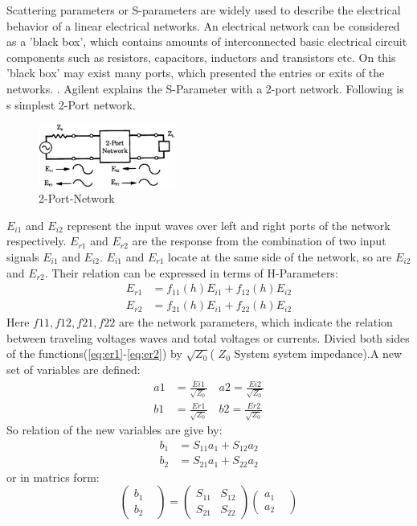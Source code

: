 
Scattering parameters or S-parameters are widely used to describe the electrical behavior of a linear electrical networks. An electrical network can be considered as a 'black box', which contains amounts of interconnected basic electrical circuit components such as  resistors, capacitors, inductors and transistors etc. On this 'black box' may exist many ports, which presented the entries or exits of the networks. 
.
Agilent\cite{aglient_s_parameters} explains the S-Parameter with a 2-port network. Following is s simplest 2-Port network.
\begin{figure}
\centering
\includegraphics[width=0.4\textwidth]{bilder/s_parameters}
\caption{2-Port-Network \cite{aglient_s_parameters}}
\label{fig:2_port_network}
\end{figure}
$E_{i1}$ and $E_{i2}$ represent the input waves over left and right ports of the network respectively. $E_{r1}$ and $E_{r2}$ are the response from the combination of two input signals $E_{i1}$ and $E_{i2}$. $E_{i1}$ and $E_{r1}$ locate at the same side of the network, so are $E_{i2}$ and $E_{r2}$. Their relation can  be expressed in terms of H-Parameters: 
\begin{align}
E_{r1}&=f_{11}(h)E_{i1}+f_{12}(h)E_{i2}
\label{eq:er1}
\\
E_{r2}&=f_{21}(h)E_{i1}+f_{22}(h)E_{i2}
\label{eq:er2}
\end{align}
Here $f11,f12,f21,f22$ are the network parameters, which indicate the relation between traveling voltages waves  and total voltages or currents. Divied both sides of the functions(\ref{eq:er1}-\ref{eq:er2}) by $\sqrt{Z_{0}}$( $Z_{0}$ System system impedance).A new set of variables are defined:
\begin{align} 
a1&=\frac{Ei1}{\sqrt{Z_{0}}} \quad a2=\frac{Ei2}{\sqrt{Z_{0}}}\\
b1&=\frac{Er1}{\sqrt{Z_{0}}} \quad b2=\frac{Er2}{\sqrt{Z_{0}}}
\end{align}
So relation of the new variables are give by:
\begin{align}
b_{1}&=S_{11}a_{1}+S_{12}a_{2}\\
b_{2}&=S_{21}a_{1}+S_{22}a_{2}
\end{align}
or in matrics form:
\begin{equation}
		\begin{pmatrix}
			b_{1}&\\
			b_{2}&
		\end{pmatrix}
	=	
		\begin{pmatrix}
			S_{11}&S_{12}\\
			S_{21}&S_{22}
		\end{pmatrix}
		\begin{pmatrix}
			a_{1}&\\
			a_{2}&
		\end{pmatrix}
\label{eq:s_matrix}
\end{equation}


